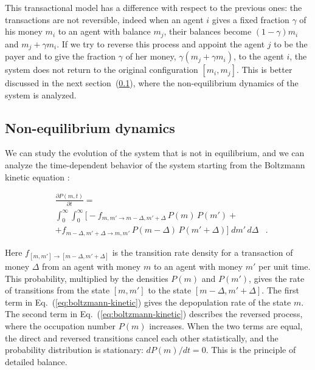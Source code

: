 This transactional model has a difference with respect to the previous ones:
the transactions are not reversible, indeed when an agent $i$ gives a fixed fraction
$\gamma$ of his money $m_i$ to an agent with balance $m_j$, their
balances become $(1-\gamma)m_i$ and $m_j + \gamma m_i$. 
If we try to reverse this process and appoint the agent $j$ to be the payer
and to give the fraction $\gamma$ of her money, $\gamma(m_j + \gamma m_i)$,
to the agent $i$, the system does not return to the original configuration $[m_i, m_j]$.
This is better discussed in the next section~(\ref{sec:non-equilibrium}), where the non-equilibrium dynamics of the system is analyzed.

\subsection{Non-equilibrium dynamics}
\label{sec:non-equilibrium}

We can study the evolution of the system that is not in equilibrium, and we can analyze the time-dependent behavior of the system starting from the Boltzmann kinetic equation \cite{Boltzmann1872}:

\begin{equation}
\label{eq:boltzmann-kinetic}
\begin{aligned}
    & \frac{\partial P(m,t)}{\partial t} = \\ 
    & \int_0^\infty\!\int_0^\infty \Big[  - f_{m,m'\to m-\Delta,m'+\Delta}\,P(m)\,P(m') + \\
    & + f_{m-\Delta,m'+\Delta\to m,m'}\,P(m-\Delta)\,P(m'+\Delta) \Big]\;dm'\,d\Delta &.
\end{aligned}
\end{equation}

Here $f_{[m,m']\rightarrow[m-\Delta,m'+\Delta]}$ is the transition rate density for a transaction of money $\Delta$ 
from an agent with money $m$ to an agent with money $m'$ per unit time. 
This probability, multiplied by the densities $P(m)$ and $P(m')$, 
gives the rate of transitions from the state $[m,m']$ to the state $[m-\Delta,m'+\Delta]$. 
The first term in Eq.~(\ref{eq:boltzmann-kinetic}) gives the depopulation rate of the state $m$. 
The second term in Eq.~(\ref{eq:boltzmann-kinetic}) describes the reversed process, 
where the occupation number $P(m)$ increases. 
When the two terms are equal, the direct and reversed transitions cancel each other statistically, 
and the probability distribution is stationary:
$dP(m)/dt = 0$. This is the principle of detailed balance.


